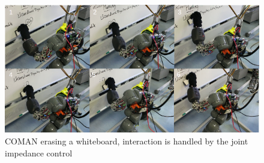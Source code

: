 \begin{figure}
        \centering
        \includegraphics[width=1.0\textwidth]{images/soft_interaction/sot_bb.png}
        \caption{COMAN erasing a whiteboard, interaction is handled by the joint impedance control}
        \label{COMAN_bb}
\end{figure}

